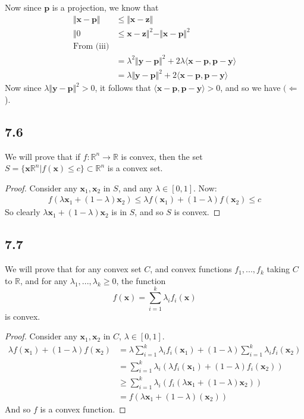 \documentclass{article}
\newcommand{\inprod}[1]{\langle #1 \rangle}
\begin{document}
	Now since $\mathbf{p}$ is a projection, we know that 
	\begin{align*}
	\Vert \mathbf{x} - \mathbf{p} \Vert &\leq \Vert \mathbf{x} - \mathbf{z} \Vert \\
	\Vert 0 &\leq \mathbf{x} - \mathbf{z} \Vert^2 - \Vert \mathbf{x} - \mathbf{p} \Vert^2 \\
	\text{From (iii)} \\
	&= \lambda^2 \Vert \mathbf{y} - \mathbf{p} \Vert^2 + 2 \lambda \inprod{\mathbf{x} - \mathbf{p}, \mathbf{p} - \mathbf{y}}  \\
	&= \lambda \Vert \mathbf{y} - \mathbf{p} \Vert^2 + 2 \inprod{\mathbf{x} - \mathbf{p}, \mathbf{p} - \mathbf{y}}
	\end{align*}
	Now since $\lambda \Vert \mathbf{y} - \mathbf{p} \Vert^2 > 0$, it follows that $\inprod{\mathbf{x} - \mathbf{p}, \mathbf{p} - \mathbf{y}} > 0$, and so we have $(\Leftarrow$).
	
	\subsection*{7.6}
	We will prove that if $f: \mathbb{R}^n \to \mathbb{R}$ is convex, then the set $S = \{ \mathbf{x} \mathbb{R}^n | f(\mathbf{x}) \leq c \} \subset \mathbb{R}^n$ is a convex set.
	
	\begin{proof}
		Consider any $\mathbf{x}_1, \mathbf{x}_2$ in $S$, and any $\lambda \in [0,1]$. Now:
		\begin{align*}
		f(\lambda \mathbf{x}_1 + (1-\lambda)\mathbf{x}_2) \leq \lambda f(\mathbf{x}_1) + (1 -\lambda) f(\mathbf{x}_2) \leq c 
		\end{align*}
		So clearly $\lambda \mathbf{x}_1 + (1-\lambda)\mathbf{x}_2$ is in $S$, and so $S$ is convex.
	\end{proof}
	
	\subsection*{7.7}
	We will prove that for any convex set $C$, and convex functions $f_1,...,f_k$ taking $C$ to $\mathbb{R}$, and for any $\lambda_1, ..., \lambda_k \geq 0$, the function 
	\[ f(\mathbf{x}) = \sum_{i=1}^{k} \lambda_i f_i(\mathbf{x}) \]
	is convex.
	
	\begin{proof}
		Consider any $\mathbf{x}_1, \mathbf{x}_2$ in $C$, $\lambda \in [0,1]$.
		\begin{align*}
		\lambda f(\mathbf{x}_1) + (1 -\lambda)f(\mathbf{x}_2) &= \lambda \sum_{i=1}^{k} \lambda_i f_i(\mathbf{x}_1) + (1 -\lambda) \sum_{i=1}^{k} \lambda_i f_i(\mathbf{x}_2) \\
		&= \sum_{i=1}^{k} \lambda_i (\lambda f_i(\mathbf{x}_1) + (1 - \lambda) f_i(\mathbf{x}_2)) \\
		&\geq \sum_{i=1}^{k} \lambda_i (f_i(\lambda \mathbf{x}_1 + (1 -\lambda)\mathbf{x}_2)) \\
		&= f(\lambda \mathbf{x}_1 + (1 -\lambda)(\mathbf{x}_2))
		\end{align*}
		And so $f$ is a convex function.
	\end{proof}
	
\end{document}
